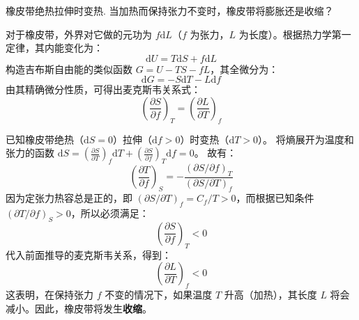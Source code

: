 \begin{exercise}\label{ex:12.10}
橡皮带绝热拉伸时变热. 当加热而保持张力不变时，橡皮带将膨胀还是收缩？
\end{exercise}
\begin{solution}
对于橡皮带，外界对它做的元功为 $f \mathrm{d}L$（$f$ 为张力，$L$ 为长度）。根据热力学第一定律，其内能变化为：
$$ \mathrm{d}U = T \mathrm{d}S + f \mathrm{d}L $$
构造吉布斯自由能的类似函数 $G = U - TS - fL$，其全微分为：
$$ \mathrm{d}G = -S \mathrm{d}T - L \mathrm{d}f $$
由其精确微分性质，可得出麦克斯韦关系式：
$$ \left( \frac{\partial S}{\partial f} \right)_T = \left( \frac{\partial L}{\partial T} \right)_f $$

已知橡皮带绝热（$\mathrm{d}S = 0$）拉伸（$\mathrm{d}f > 0$）时变热（$\mathrm{d}T > 0$）。
将熵展开为温度和张力的函数 $\mathrm{d}S = \left(\frac{\partial S}{\partial T}\right)_f \mathrm{d}T + \left(\frac{\partial S}{\partial f}\right)_T \mathrm{d}f = 0$。
故有：
$$ \left(\frac{\partial T}{\partial f}\right)_S = - \frac{(\partial S/\partial f)_T}{(\partial S/\partial T)_f} $$
因为定张力热容总是正的，即 $(\partial S/\partial T)_f = C_f / T > 0$，而根据已知条件 $(\partial T/\partial f)_S > 0$，所以必须满足：
$$ \left(\frac{\partial S}{\partial f}\right)_T < 0 $$
代入前面推导的麦克斯韦关系，得到：
$$ \left( \frac{\partial L}{\partial T} \right)_f < 0 $$
这表明，在保持张力 $f$ 不变的情况下，如果温度 $T$ 升高（加热），其长度 $L$ 将会减小。因此，橡皮带将发生\textbf{收缩}。
\end{solution}


